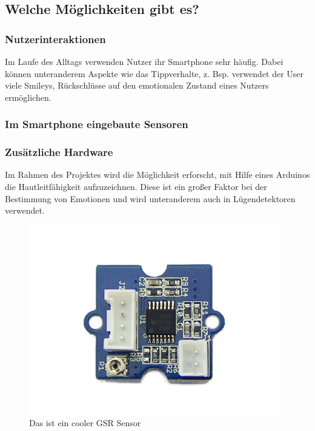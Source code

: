 \subsection{Welche Möglichkeiten gibt es?}
\subsubsection{Nutzerinteraktionen}
Im Laufe des Alltags verwenden Nutzer ihr Smartphone sehr häufig. Dabei können unteranderem Aspekte wie das Tippverhalte, 
z. Bsp. verwendet der User viele Smileys, Rückschlüsse auf den emotionalen Zustand eines Nutzers ermöglichen.
\subsubsection{Im Smartphone eingebaute Sensoren}
\subsubsection{Zusätzliche Hardware}
Im Rahmen des Projektes wird die Möglichkeit erforscht, mit Hilfe eines Arduinos die Hautleitfähigkeit aufzuzeichnen. 
Diese ist ein großer Faktor bei der Bestimmung von Emotionen und wird unteranderem auch in Lügendetektoren verwendet. 
\begin{figure}[h]
	\centering
	\includegraphics[width=11cm]{Bilder/sensor.jpg}
	\caption{Das ist ein cooler GSR Sensor}
\end{figure}%